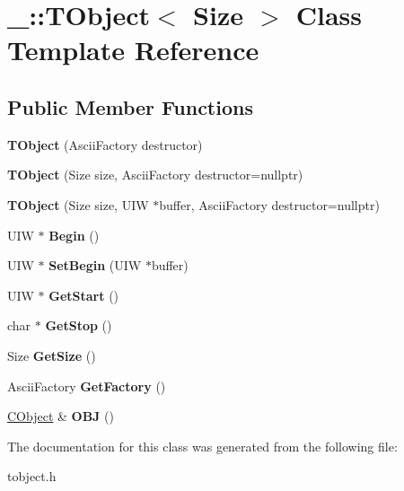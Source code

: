 \hypertarget{class___1_1_t_object}{}\section{\+\_\+\+:\+:T\+Object$<$ Size $>$ Class Template Reference}
\label{class___1_1_t_object}
\subsection*{Public Member Functions}
\begin{DoxyCompactItemize}
\item 
\mbox{\label{class___1_1_t_object_ab66313143c93737dc65406a1c26d18b6}} 
{\bfseries T\+Object} (Ascii\+Factory destructor)
\item 
\mbox{\label{class___1_1_t_object_a03fb0b9ab63401aab298ec35146481f6}} 
{\bfseries T\+Object} (Size size, Ascii\+Factory destructor=nullptr)
\item 
\mbox{\label{class___1_1_t_object_a1cabcbc1b77526710d914e6dbab6038e}} 
{\bfseries T\+Object} (Size size, U\+IW $\ast$buffer, Ascii\+Factory destructor=nullptr)
\item 
\mbox{\label{class___1_1_t_object_a8715af5669f93f72bcf927c02c05698e}} 
U\+IW $\ast$ {\bfseries Begin} ()
\item 
\mbox{\label{class___1_1_t_object_af8b5a63d74793675ac77438573d5370c}} 
U\+IW $\ast$ {\bfseries Set\+Begin} (U\+IW $\ast$buffer)
\item 
\mbox{\label{class___1_1_t_object_a6823952bcd0510820b87cb48cc8f032c}} 
U\+IW $\ast$ {\bfseries Get\+Start} ()
\item 
\mbox{\label{class___1_1_t_object_aa07ab6d1984edf2551ccde4ee4646ec0}} 
char $\ast$ {\bfseries Get\+Stop} ()
\item 
\mbox{\label{class___1_1_t_object_a965cbdc8be82d0e642b8a016d6befcb7}} 
Size {\bfseries Get\+Size} ()
\item 
\mbox{\label{class___1_1_t_object_a9179aa66e7f300bf2706d4099d2cb8dc}} 
Ascii\+Factory {\bfseries Get\+Factory} ()
\item 
\mbox{\label{class___1_1_t_object_a46ef3097bab2a912c3c311c2e1227066}} 
\mbox{\hyperlink{struct___1_1_c_object}{C\+Object}} \& {\bfseries O\+BJ} ()
\end{DoxyCompactItemize}


The documentation for this class was generated from the following file\+:\begin{DoxyCompactItemize}
\item 
tobject.\+h\end{DoxyCompactItemize}
